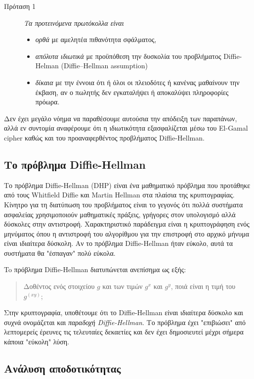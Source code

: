 \documentclass[letterpaper,11pt]{article}
\begin{document}
\begin{description}
	\item[Πρόταση 1] \emph{Τα προτεινόμενα πρωτόκολλα είναι}
		\begin{itemize}
			\item \emph{ορθά} με αμελητέα πιθανότητα σφάλματος,
			\item \emph{απόλυτα ιδιωτικά} με προϋπόθεση την δυσκολία του προβλήματος Diffie-Helman (Diffie–Hellman assumption) 
			\item \emph{δίκαια} με την έννοια ότι ή όλοι οι πλειοδότες ή κανένας μαθαίνουν την έκβαση, αν ο πωλητής δεν εγκαταλήψει ή αποκαλύψει
			πληροφορίες πρόωρα.
		\end{itemize}
\end{description}

Δεν έχει μεγάλο νόημα να παραθέσουμε αυτούσια την απόδειξη των παραπάνων, αλλά εν συντομία αναφέρουμε ότι η ιδιωτικότητα εξασφαλίζεται μέσω του
El-Gamal cipher καθώς και του προαναφερθέντος προβλήματος Diffie-Hellman.

\subsection{Το πρόβλημα Diffie-Hellman}

Το πρόβλημα Diffie-Hellman (DHP) είναι ένα μαθηματικό πρόβλημα που προτάθηκε από τους Whitfield Diffie και Martin Hellman στα πλαίσια της
κρυπτογραφίας. Κίνητρο για τη διατύπωση του προβλήματος είναι το γεγονός ότι πολλά συστήματα ασφαλείας χρησιμοποιούν μαθηματικές πράξεις, γρήγορες
στον υπολογισμό αλλά δύσκολες στην αντιστροφή. Χαρακτηριστικό παράδειγμα είναι η κρυπτογράφηση ενός μηνύματος όπου η αντιστροφή του αλγορίθμου για
την επιστροφή στο αρχικό μήνυμα είναι ιδιαίτερα δύσκολη. Αν το πρόβλημα Diffie-Hellman ήταν εύκολο, αυτά τα συστήματα θα "έσπαγαν" πολύ εύκολα.

To πρόβλημα Diffie-Hellman διατυπώνεται ανεπίσημα ως εξής:

 \begin{quote} Δοθέντος ενός στοιχείου $g$ και των τιμών $g^x$ και $g^y$, ποιά είναι η τιμή του $g^(xy)$; \end{quote}

Στην κρυπτογραφία, υποθέτουμε ότι το Diffie-Hellman είναι ιδιαίτερα δύσκολο και συχνά ονομάζεται και \emph{παραδοχή Diffie-Hellman}. Το πρόβλημα
έχει "επιβιώσει" από λεπτομερείς έρευνες τις τελευταίες δεκαετίες και δεν έχει δημοσιευτεί μέχρι σήμερα κάποια "εύκολη" λύση.

\subsection{Ανάλυση αποδοτικότητας}
\end{document}
